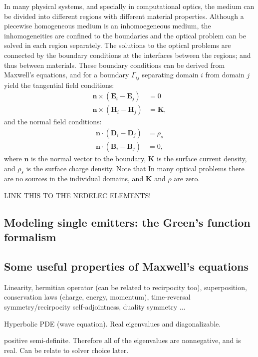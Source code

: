 In many physical systems, and specially in computational optics, the medium can be divided
into different regions with different material properties. Although a piecewise homogeneous
medium is an inhomoegeneous medium, the inhomogeneities are confined to the boundaries and 
the optical problem can be solved in each region separately. The solutions to the optical problems
are connected by the boundary conditions at the interfaces between the regions; and thus between
materials. These boundary conditions can be derived from Maxwell's equations, and for a boundary
$\Gamma_{ij}$ separating domain $i$ from domain $j$ yield the tangential field conditions:
\begin{align}
    \mathbf{n} \times (\mathbf{E}_i - \mathbf{E}_j) &= 0 \label{eq:BC_E}\\
    \mathbf{n} \times (\mathbf{H}_i - \mathbf{H}_j) &= \mathbf{K} , \label{eq:BC_H}
\end{align} 
and the normal field conditions:
\begin{align}
    \mathbf{n} \cdot (\mathbf{D}_i - \mathbf{D}_j) &= \rho_s \label{eq:BC_D}\\
    \mathbf{n} \cdot (\mathbf{B}_i - \mathbf{B}_j) &= 0, \label{eq:BC_B}
\end{align}
where $\mathbf{n}$ is the normal vector to the boundary, $\mathbf{K}$ is the surface current density,
 and $\rho_s$ is the surface charge density. Note that In many optical problems there are no 
 sources in the individual domains, and $\mathbf{K}$ and $\rho$ are zero.

 LINK THIS TO THE NEDELEC ELEMENTS!

\subsection*{Modeling single emitters: the Green's function formalism}

\subsection*{Some useful properties of Maxwell's equations}

Linearity, hermitian operator (can be related to recirpocity too), superposition, 
conservation laws (charge, energy, momentum), time-reversal symmetry/recirpocity
self-adjointness, duality symmetry ...

Hyperbolic PDE (wave equation). Real eigenvalues and diagonalizable.

positive semi-definite. Therefore all of the eigenvalues are nonnegative, and is real. Can
be relate to solver choice later.

